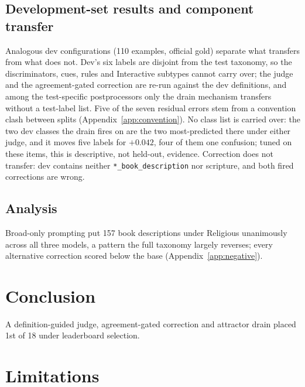 \documentclass[11pt]{article}
\begin{document}
\subsection{Development-set results and component transfer}
\label{sec:dev}
Analogous dev configurations (110 examples, official gold) separate what transfers from what does
not. Dev's six labels are disjoint from the test taxonomy, so the discriminators, cues, rules and
Interactive subtypes cannot carry over; the judge and the agreement-gated correction are re-run
against the dev definitions, and among the test-specific postprocessors only the drain mechanism
transfers without a test-label list. Five of the seven residual errors stem from a convention
clash between splits (Appendix~\ref{app:convention}). No class list is carried over: the two dev
classes the drain fires on are the two most-predicted there under either judge, and it moves five
labels for $+0.042$, four of them one confusion; tuned on these items, this is descriptive, not
held-out, evidence. Correction does not transfer: dev contains neither
\texttt{*\_book\_description} nor scripture, and both fired corrections are wrong.

\subsection{Analysis}
\label{sec:analysis}
Broad-only prompting put 157 book descriptions under Religious unanimously across all three
models, a pattern the full taxonomy largely reverses; every alternative correction scored below the base
(Appendix~\ref{app:negative}).

\section{Conclusion}
A definition-guided judge, agreement-gated correction and attractor drain placed 1st of 18
under leaderboard selection.

\section*{Limitations}
\end{document}
